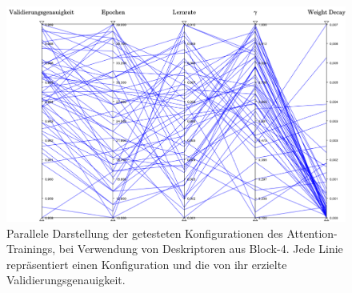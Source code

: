 \begin{figure}[h]
\includegraphics[scale=0.52]{NNOPT/Anhang/layer4_attention.pdf}
\caption{Parallele Darstellung der getesteten Konfigurationen des Attention-Trainings, bei Verwendung von Deskriptoren aus \mbox{Block-4}. Jede Linie repräsentiert einen Konfiguration und die von ihr erzielte Validierungsgenauigkeit.}
\label{hyperopt_layer4_2}
\end{figure}
\newpage
